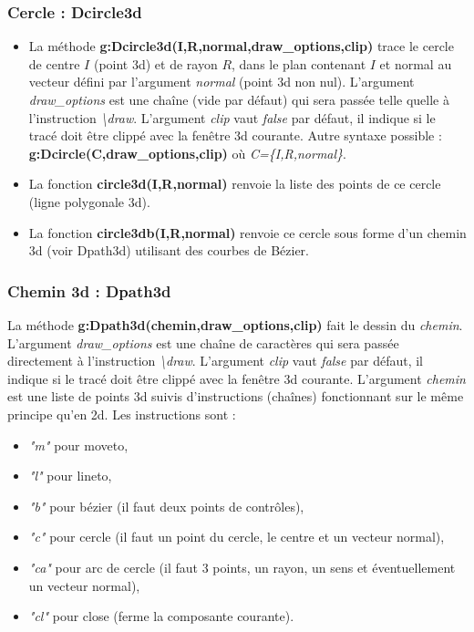 \subsubsection{Cercle : Dcircle3d}

\begin{itemize}
    \item La méthode \textbf{g:Dcircle3d(I,R,normal,draw\_options,clip)} trace le cercle de centre $I$ (point 3d) et de rayon $R$, dans le plan contenant $I$ et normal au vecteur défini par l'argument \emph{normal} (point 3d non nul). L'argument \emph{draw\_options} est une chaîne (vide par défaut) qui sera passée telle quelle à l'instruction \emph{\textbackslash draw}. L'argument \emph{clip} vaut \emph{false} par défaut, il indique si le tracé doit être clippé avec la fenêtre 3d courante. Autre syntaxe possible :  \textbf{g:Dcircle(C,draw\_options,clip)} où \emph{C=\{I,R,normal\}}.
    
    \item La fonction \textbf{circle3d(I,R,normal)} renvoie la liste des points de ce cercle (ligne polygonale 3d). 
    
    \item La fonction \textbf{circle3db(I,R,normal)} renvoie ce cercle sous forme d'un chemin 3d (voir Dpath3d) utilisant des courbes de Bézier.
\end{itemize}
    
\subsubsection{Chemin 3d : Dpath3d}

La méthode \textbf{g:Dpath3d(chemin,draw\_options,clip)} fait le dessin du \emph{chemin}. L'argument \emph{draw\_options} est une chaîne de caractères qui sera passée directement à l'instruction \emph{\textbackslash draw}. L'argument \emph{clip} vaut \emph{false} par défaut, il indique si le tracé doit être clippé avec la fenêtre 3d courante. L'argument \emph{chemin} est une liste de points 3d suivis d'instructions (chaînes) fonctionnant sur le même principe qu'en 2d. Les instructions sont :
    \begin{itemize}
      \item \emph{"m"} pour moveto,
      \item \emph{"l"} pour lineto,
      \item \emph{"b"} pour bézier (il faut deux points de contrôles),
      \item \emph{"c"} pour cercle (il faut un point du cercle, le centre et un vecteur normal),
      \item \emph{"ca"} pour arc de cercle (il faut 3 points, un rayon, un sens et éventuellement un vecteur normal),
      \item \emph{"cl"} pour close (ferme la composante courante).
      \end{itemize}

